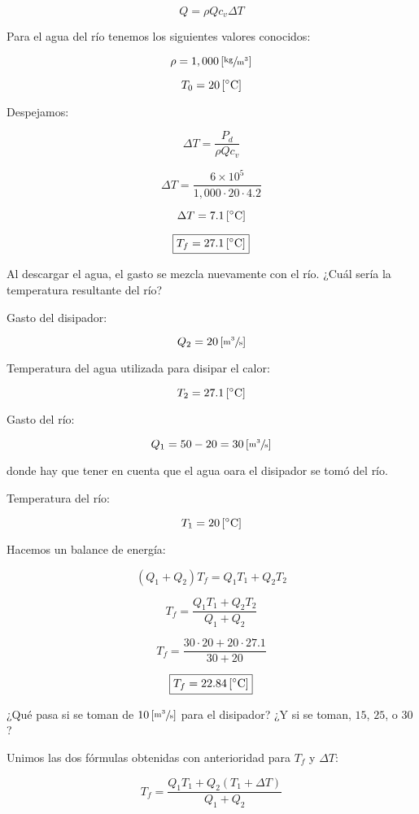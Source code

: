 \documentclass[11pt]{article}
\begin{document}
\[ Q = \rho Q c_v \Delta T \]

Para el agua del río tenemos los siguientes valores conocidos:

\[ \rho = 1,000 \left[ \sfrac{\text{kg}}{\text{m}^3} \right] \]

\[ T_0 = 20 \left[ \degree \text{C} \right] \]

Despejamos:

\[ \Delta T = \frac{P_d}{\rho Q c_v} \]

\[ \Delta T = \frac{6 \times 10^5}{1,000 \cdot 20 \cdot 4.2} \]

\[ \Delta T = 7.1 \left[ \degree \text{C} \right] \]

\[ \boxed{ T_f = 27.1 \left[ \degree \text{C} \right] } \]

Al descargar el agua, el gasto se mezcla nuevamente con el río. ¿Cuál sería la temperatura resultante del río?

Gasto del disipador:

\[ Q_2 = 20 \left[ \sfrac{\text{m}^3}{\text{s}} \right] \]

Temperatura del agua utilizada para disipar el calor:

\[ T_2 = 27.1 \left[ \degree \text{C} \right] \]

Gasto del río:

\[ Q_1 = 50 - 20 = 30 \left[ \sfrac{\text{m}^3}{\text{s}} \right] \]

donde hay que tener en cuenta que el agua oara el disipador se tomó del río.

Temperatura del río:

\[ T_1 = 20 \left[ \degree \text{C} \right] \]

Hacemos un balance de energía:

\[ \left( Q_1 + Q_2 \right) T_f = Q_1 T_1 + Q_2 T_2 \]

\[ T_f = \frac{Q_1 T_1 + Q_2 T_2}{Q_1 + Q_2} \]

\[ T_f = \frac{30 \cdot 20 + 20 \cdot 27.1}{30 + 20} \]

\[ \boxed{T_f = 22.84 \left[ \degree \text{C} \right] } \]

¿Qué pasa si se toman de \( 10 \left[ \sfrac{\text{m}^3}{\text{s}} \right] \) para el disipador? ¿Y si se toman, \( 15 \), \( 25 \), o \( 30 \)?

Unimos las dos fórmulas obtenidas con anterioridad para \( T_f \) y \( \Delta T \):

\[ T_f = \frac{Q_1 T_1 + Q_2 \left( T_1 + \Delta T \right)}{Q_1 + Q_2} \]
\end{document}
